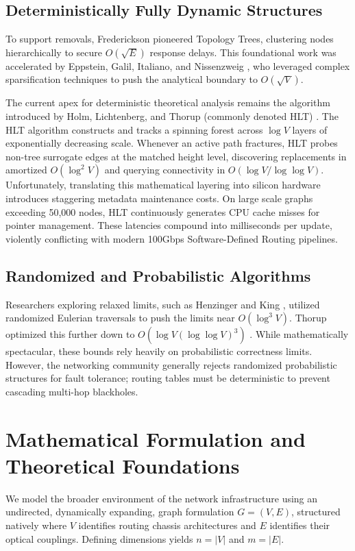 \documentclass[runningheads]{llncs}
\begin{document}
\subsection{Deterministically Fully Dynamic Structures}
To support removals, Frederickson \cite{ref5} pioneered Topology Trees, clustering nodes hierarchically to secure $O(\sqrt{E})$ response delays. This foundational work was accelerated by Eppstein, Galil, Italiano, and Nissenzweig \cite{ref6}, who leveraged complex sparsification techniques to push the analytical boundary to $O(\sqrt{V})$. 

The current apex for deterministic theoretical analysis remains the algorithm introduced by Holm, Lichtenberg, and Thorup (commonly denoted HLT) \cite{ref3}. The HLT algorithm constructs and tracks a spinning forest across $\log V$ layers of exponentially decreasing scale. Whenever an active path fractures, HLT probes non-tree surrogate edges at the matched height level, discovering replacements in amortized $O(\log^2 V)$ and querying connectivity in $O(\log V / \log \log V)$. Unfortunately, translating this mathematical layering into silicon hardware introduces staggering metadata maintenance costs. On large scale graphs exceeding 50,000 nodes, HLT continuously generates CPU cache misses for pointer management. These latencies compound into milliseconds per update, violently conflicting with modern 100Gbps Software-Defined Routing pipelines.

\subsection{Randomized and Probabilistic Algorithms}
Researchers exploring relaxed limits, such as Henzinger and King \cite{ref7}, utilized randomized Eulerian traversals to push the limits near $O(\log^3 V)$. Thorup optimized this further down to $O(\log V (\log \log V)^3)$ \cite{ref8}. While mathematically spectacular, these bounds rely heavily on probabilistic correctness limits. However, the networking community generally rejects randomized probabilistic structures for fault tolerance; routing tables must be deterministic to prevent cascading multi-hop blackholes. 

\section{Mathematical Formulation and Theoretical Foundations}

We model the broader environment of the network infrastructure using an undirected, dynamically expanding, graph formulation $G = (V, E)$, structured natively where $V$ identifies routing chassis architectures and $E$ identifies their optical couplings. Defining dimensions yields $n = |V|$ and $m = |E|$.
\end{document}
